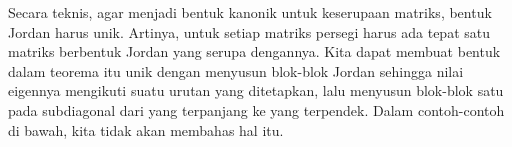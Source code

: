 


\begin{remark}
Secara teknis, agar menjadi bentuk kanonik untuk
keserupaan matriks,
bentuk Jordan harus unik.
Artinya, untuk setiap matriks persegi harus ada tepat satu
matriks berbentuk Jordan yang serupa dengannya.
Kita dapat membuat bentuk dalam teorema itu unik
dengan menyusun blok-blok Jordan sehingga nilai eigennya mengikuti
suatu urutan yang ditetapkan, lalu menyusun
blok-blok satu pada subdiagonal dari
yang terpanjang ke yang terpendek.
Dalam contoh-contoh di bawah, kita tidak akan membahas hal itu.
\end{remark}

